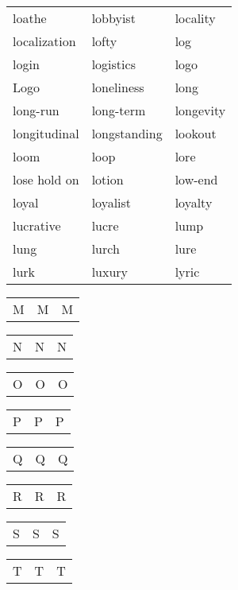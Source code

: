 \documentclass{minimal}
\begin{document}
\begin{longtable}{p{2.8cm}p{2.8cm}p{2.8cm}}
loathe & lobbyist & locality \\
localization & lofty & log \\
login & logistics & logo \\
Logo & loneliness & long \\
long-run & long-term & longevity \\
longitudinal & longstanding & lookout \\
loom & loop & lore \\
lose hold on & lotion & low-end \\
loyal & loyalist & loyalty \\
lucrative & lucre & lump \\
lung & lurch & lure \\
lurk & luxury & lyric
\end{longtable}

\begin{longtable}{p{2.8cm}p{2.8cm}p{2.8cm}}
M & M & M
\end{longtable}

\begin{longtable}{p{2.8cm}p{2.8cm}p{2.8cm}}
N & N & N
\end{longtable}

\begin{longtable}{p{2.8cm}p{2.8cm}p{2.8cm}}
O & O & O
\end{longtable}

\begin{longtable}{p{2.8cm}p{2.8cm}p{2.8cm}}
P & P & P
\end{longtable}

\begin{longtable}{p{2.8cm}p{2.8cm}p{2.8cm}}
Q & Q & Q
\end{longtable}

\begin{longtable}{p{2.8cm}p{2.8cm}p{2.8cm}}
R & R & R
\end{longtable}

\begin{longtable}{p{2.8cm}p{2.8cm}p{2.8cm}}
S & S & S
\end{longtable}

\begin{longtable}{p{2.8cm}p{2.8cm}p{2.8cm}}
T & T & T
\end{longtable}
\end{document}
